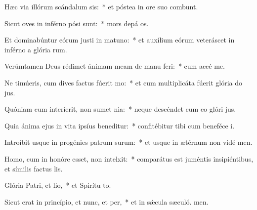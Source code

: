 \item Hæc via illórum scándalum sis:~* et póstea in ore suo combunt.
\item Sicut oves in inférno pósi sunt:~* mors depá os.
\item Et dominabúntur eórum justi in matuno:~* et auxílium eórum veteráscet in inférno a glória rum.
\item Verúmtamen Deus rédimet ánimam meam de manu feri:~* cum accé me.
\item Ne timúeris, cum dives factus fúerit mo:~* et cum multiplicáta fúerit glória do jus.
\item Quóniam cum interíerit, non sumet nia:~* neque descéndet cum eo glóri jus.
\item Quia ánima ejus in vita ipsíus beneditur:~* confitébitur tibi cum beneféce i.
\item Introíbit usque in progénies patrum surum:~* et usque in ætérnum non vidé men.
\item Homo, cum in honóre esset, non intelxit:~* comparátus est juméntis insipiéntibus, et símilis factus  lis.
\item Glória Patri, et lio,~* et Spirítu to.
\item Sicut erat in princípio, et nunc, et per,~* et in sǽcula sæculó. men.
